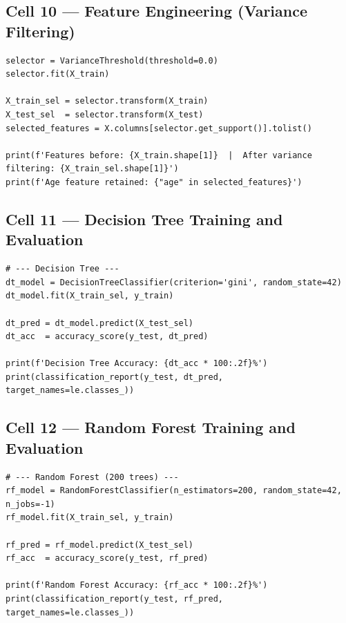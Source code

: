 \documentclass[12pt,a4paper]{article}
\begin{document}
\subsection{Cell 10 --- Feature Engineering (Variance Filtering)}

\begin{lstlisting}[caption=Cell 10: Zero-Variance Feature Removal]
selector = VarianceThreshold(threshold=0.0)
selector.fit(X_train)

X_train_sel = selector.transform(X_train)
X_test_sel  = selector.transform(X_test)
selected_features = X.columns[selector.get_support()].tolist()

print(f'Features before: {X_train.shape[1]}  |  After variance filtering: {X_train_sel.shape[1]}')
print(f'Age feature retained: {"age" in selected_features}')
\end{lstlisting}

\subsection{Cell 11 --- Decision Tree Training and Evaluation}

\begin{lstlisting}[caption=Cell 11: Decision Tree Classifier]
# --- Decision Tree ---
dt_model = DecisionTreeClassifier(criterion='gini', random_state=42)
dt_model.fit(X_train_sel, y_train)

dt_pred = dt_model.predict(X_test_sel)
dt_acc  = accuracy_score(y_test, dt_pred)

print(f'Decision Tree Accuracy: {dt_acc * 100:.2f}%')
print(classification_report(y_test, dt_pred, target_names=le.classes_))
\end{lstlisting}

\subsection{Cell 12 --- Random Forest Training and Evaluation}

\begin{lstlisting}[caption=Cell 12: Random Forest Classifier (200 Trees)]
# --- Random Forest (200 trees) ---
rf_model = RandomForestClassifier(n_estimators=200, random_state=42, n_jobs=-1)
rf_model.fit(X_train_sel, y_train)

rf_pred = rf_model.predict(X_test_sel)
rf_acc  = accuracy_score(y_test, rf_pred)

print(f'Random Forest Accuracy: {rf_acc * 100:.2f}%')
print(classification_report(y_test, rf_pred, target_names=le.classes_))
\end{lstlisting}
\end{document}
